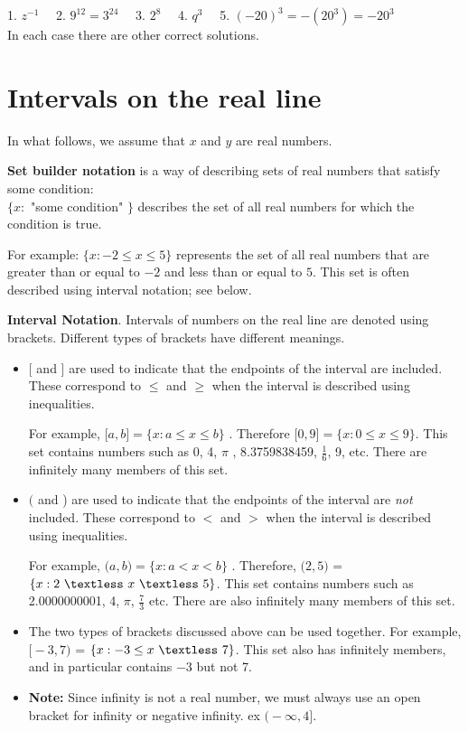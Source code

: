 \documentclass[11pt]{book}               %
\begin{document}
1. $ z^{-1} \quad$ 2. $ 9^{12} = 3^{24}\quad$ 3. $ 2^8\quad $ 4. $ q^3 \quad $ 5. $ (-20)^3 = - (20^3) = -20^3 $\\
In each case there are other correct solutions.

\newpage
\section{Intervals on the real line}

In what follows, we assume that $x$ and $y$ are real numbers.


\noindent \textbf{Set builder notation} is a way of describing sets of real numbers that satisfy some condition:\\
$\{ x:$ "some condition" $\}$ describes the set of all real numbers for which the condition is true.  

For example:
$ \{ x : -2 \leq x \leq 5 \}$ represents the set of all real numbers that are greater than or equal to $-2$ and less than or equal to $5$.
This set is often described using interval notation; see below.


\noindent \textbf{Interval Notation}.  Intervals of numbers on the real line are denoted using brackets.  Different types of brackets have different meanings.

\begin{itemize}
\item $\big[$ and \big] are used to indicate that the endpoints of the interval are included. These correspond to $\leq$ and $\geq$ when the interval is described using inequalities.

For example, $ \big[ a, b \big] = \{ x: a\leq x\leq b\} $ . Therefore $ \big[ 0, 9 \big] =  \{ x : 0 \leq x \leq 9 \}$.  
This set contains numbers such as 0, 4, $ \pi$ , 8.3759838459, $ \frac{1}{6} $, 9, etc. There are infinitely many members of this set. 



\item $\big($ and \big) are used to indicate that the endpoints of the interval are \emph{not} included. These correspond to $<$ and $>$ when the interval is described using inequalities.

For example, $ \big( a, b \big) = \{ x: a < x < b\} $ .  Therefore,
$ \big( 2, 5 \big) $ = $ \{ x : 2  \ \textless \ x \ \textless\  5 \}$. 
This set contains numbers such as 2.0000000001, 4, $ \pi$, $ \frac{7}{3} $ etc. There are also infinitely many members of this set.


\item The two types of brackets discussed above can be used together. For example,\\
 $ \big[ -3, 7 \big) $ = $ \{ x : -3  \leq x \ \textless \  7 \}$.
This set also has infinitely members, and in particular contains $-3$ but not 7.


\item \textbf{Note:} Since infinity is not a real number, we must always use an open bracket for infinity or negative infinity. ex $ \big ( -\infty , 4 \big ]$.
\end{itemize}
\end{document}
